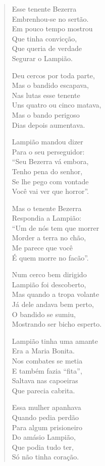 \begin{verse}
Esse tenente Bezerra\\
Embrenhou-se no sertão.\\
Em pouco tempo mostrou\\
Que tinha convicção,\\
Que queria de verdade\\
Segurar o Lampião.

Deu cercos por toda parte,\\
Mas o bandido escapava,\\
Nas lutas esse tenente\\
Uns quatro ou cinco matava,\\
Mas o bando perigoso\\
Dias depois aumentava.

Lampião mandou dizer\\
Para o seu perseguidor:\\
“Seu Bezerra vá embora,\\
Tenho pena do senhor,\\
Se lhe pego com vontade\\
Você vai ver que horror”.

Mas o tenente Bezerra\\
Respondia a Lampião:\\
“Um de nós tem que morrer\\
Morder a terra no chão,\\
Me parece que você\\
É quem morre no facão”.
\pagebreak

Num cerco bem dirigido\\
Lampião foi descoberto,\\
Mas quando a tropa volante\\
Já dele andava bem perto,\\
O bandido se sumiu,\\
Mostrando ser bicho esperto.

Lampião tinha uma amante\\
Era a Maria Bonita.\\
Nos combates se metia\\
E também fazia “fita”,\\
Saltava nas capoeiras\\
Que parecia cabrita.

Essa mulher apanhava\\
Quando pedia perdão\\
Para algum prisioneiro\\
Do amásio Lampião,\\
Que podia tudo ter,\\
Só não tinha coração.


\end{verse}

